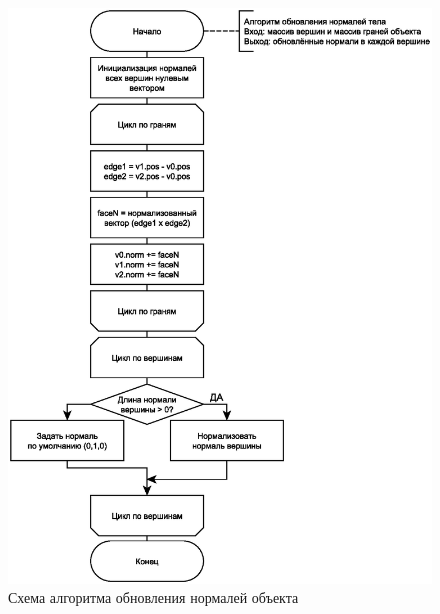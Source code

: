 \begin{figure}[h!]
    \centering
    \includegraphics[scale=0.4]{img/normals.eps}
    \caption{Схема алгоритма обновления нормалей объекта}
    \label{fig}
\end{figure}
